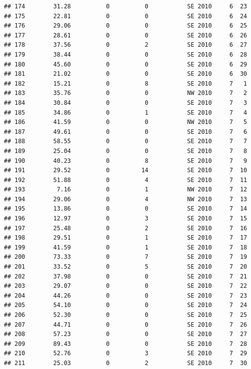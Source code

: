 \documentclass[
]{article}
\begin{document}
\begin{verbatim}
## 174        31.28          0          0           SE 2010     6  23
## 175        22.81          0          0           SE 2010     6  24
## 176        29.06          0          0           SE 2010     6  25
## 177        28.61          0          0           SE 2010     6  26
## 178        37.56          0          2           SE 2010     6  27
## 179        38.44          0          0           SE 2010     6  28
## 180        45.60          0          0           SE 2010     6  29
## 181        21.02          0          0           SE 2010     6  30
## 182        15.21          0          8           SE 2010     7   1
## 183        35.76          0          0           NW 2010     7   2
## 184        30.84          0          0           SE 2010     7   3
## 185        34.86          0          1           SE 2010     7   4
## 186        41.59          0          0           NW 2010     7   5
## 187        49.61          0          0           SE 2010     7   6
## 188        58.55          0          0           SE 2010     7   7
## 189        25.04          0          0           SE 2010     7   8
## 190        40.23          0          8           SE 2010     7   9
## 191        29.52          0         14           SE 2010     7  10
## 192        51.88          0          4           SE 2010     7  11
## 193         7.16          0          1           NW 2010     7  12
## 194        29.06          0          4           NW 2010     7  13
## 195        13.86          0          0           SE 2010     7  14
## 196        12.97          0          3           SE 2010     7  15
## 197        25.48          0          2           SE 2010     7  16
## 198        29.51          0          1           SE 2010     7  17
## 199        41.59          0          1           SE 2010     7  18
## 200        73.33          0          7           SE 2010     7  19
## 201        33.52          0          5           SE 2010     7  20
## 202        37.98          0          0           SE 2010     7  21
## 203        29.07          0          0           SE 2010     7  22
## 204        44.26          0          0           SE 2010     7  23
## 205        54.10          0          0           SE 2010     7  24
## 206        52.30          0          0           SE 2010     7  25
## 207        44.71          0          0           SE 2010     7  26
## 208        57.23          0          0           SE 2010     7  27
## 209        89.43          0          0           SE 2010     7  28
## 210        52.76          0          3           SE 2010     7  29
## 211        25.03          0          2           SE 2010     7  30

\end{verbatim}
\end{document}

